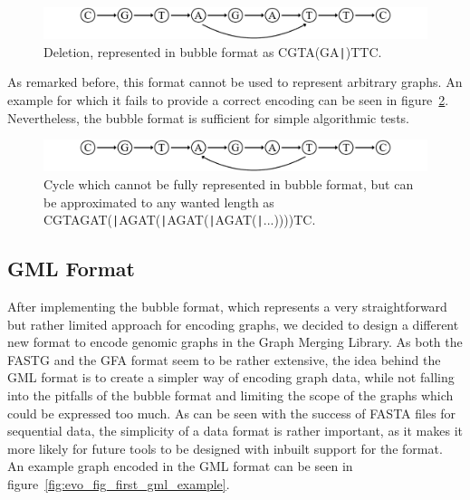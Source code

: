 \documentclass[a4paper,12pt,twoside,BCOR=10mm]{scrbook}
\def\pipe{\texttt{|}}
\begin{document}
\begin{figure}[!htb]
\centering
\includegraphics[width=\textwidth]{evo_fig_STPUinsertion_f.pdf}
\caption[Deletion in bubble format]{Deletion, represented in bubble format as \textup{CGTA(GA\pipe )TTC}.} \label{fig:evo_fig_STPUinsertion_f}
\end{figure}

As remarked before, this format cannot be used to represent arbitrary graphs.
An example for which it fails to provide a correct encoding can be seen in figure~\ref{fig:evo_fig_STPUcycle_f}.
Nevertheless, the bubble format is sufficient for simple algorithmic tests.

\begin{figure}[!htb]
\centering
\includegraphics[width=\textwidth]{evo_fig_STPUcycle_f.pdf}
\caption[Cycle in bubble format]{Cycle which cannot be fully represented in bubble format, but can be approximated to any wanted length as \textup{CGTAGAT(\pipe AGAT(\pipe AGAT(\pipe AGAT(\pipe ...))))TC}.} \label{fig:evo_fig_STPUcycle_f}
\end{figure}

\subsection{GML Format}
\label{sec:def:gml_format}

After implementing the bubble format, which represents a very straightforward but rather
limited approach for encoding graphs,
we decided to design a different new format to encode genomic graphs in the Graph Merging Library.
As both the FASTG and the GFA format seem to be rather extensive,
the idea behind the GML format is to create a simpler way of encoding graph data,
while not falling into the pitfalls of the bubble format and limiting the scope of
the graphs which could be expressed too much.
As can be seen with the success of FASTA files for sequential data,
the simplicity of a data format is rather important, as it makes it more likely
for future tools to be designed with inbuilt support for the format. \\
An example graph encoded in the GML format can be seen in figure~\ref{fig:evo_fig_first_gml_example}.
\end{document}
